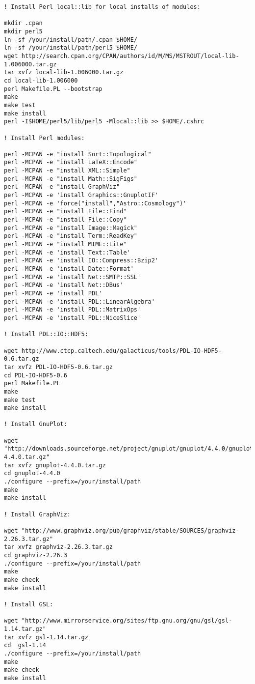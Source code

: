 \begin{lstlisting}[language=simple,stringstyle=\ttfamily,commentstyle=\itshape]
! Install Perl local::lib for local installs of modules:

mkdir .cpan
mkdir perl5
ln -sf /your/install/path/.cpan $HOME/
ln -sf /your/install/path/perl5 $HOME/
wget http://search.cpan.org/CPAN/authors/id/M/MS/MSTROUT/local-lib-1.006000.tar.gz
tar xvfz local-lib-1.006000.tar.gz 
cd local-lib-1.006000
perl Makefile.PL --bootstrap
make
make test
make install
perl -I$HOME/perl5/lib/perl5 -Mlocal::lib >> $HOME/.cshrc

! Install Perl modules:

perl -MCPAN -e "install Sort::Topological"
perl -MCPAN -e "install LaTeX::Encode"
perl -MCPAN -e "install XML::Simple"
perl -MCPAN -e "install Math::SigFigs"
perl -MCPAN -e "install GraphViz"
perl -MCPAN -e 'install Graphics::GnuplotIF'
perl -MCPAN -e 'force("install","Astro::Cosmology")'
perl -MCPAN -e "install File::Find"
perl -MCPAN -e "install File::Copy"
perl -MCPAN -e "install Image::Magick"
perl -MCPAN -e "install Term::ReadKey"
perl -MCPAN -e "install MIME::Lite"
perl -MCPAN -e 'install Text::Table'
perl -MCPAN -e 'install IO::Compress::Bzip2'
perl -MCPAN -e 'install Date::Format'
perl -MCPAN -e 'install Net::SMTP::SSL'
perl -MCPAN -e 'install Net::DBus'
perl -MCPAN -e 'install PDL'
perl -MCPAN -e 'install PDL::LinearAlgebra'
perl -MCPAN -e 'install PDL::MatrixOps'
perl -MCPAN -e 'install PDL::NiceSlice'

! Install PDL::IO::HDF5:

wget http://www.ctcp.caltech.edu/galacticus/tools/PDL-IO-HDF5-0.6.tar.gz
tar xvfz PDL-IO-HDF5-0.6.tar.gz
cd PDL-IO-HDF5-0.6
perl Makefile.PL
make
make test
make install

! Install GnuPlot:

wget "http://downloads.sourceforge.net/project/gnuplot/gnuplot/4.4.0/gnuplot-4.4.0.tar.gz"
tar xvfz gnuplot-4.4.0.tar.gz
cd gnuplot-4.4.0
./configure --prefix=/your/install/path
make
make install

! Install GraphViz:

wget "http://www.graphviz.org/pub/graphviz/stable/SOURCES/graphviz-2.26.3.tar.gz"
tar xvfz graphviz-2.26.3.tar.gz
cd graphviz-2.26.3
./configure --prefix=/your/install/path
make
make check
make install

! Install GSL:

wget "http://www.mirrorservice.org/sites/ftp.gnu.org/gnu/gsl/gsl-1.14.tar.gz"
tar xvfz gsl-1.14.tar.gz
cd  gsl-1.14
./configure --prefix=/your/install/path
make
make check
make install


\end{lstlisting}
